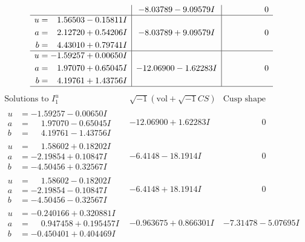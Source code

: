 \documentclass[1p]{elsarticle_modified}
\theoremstyle{definition}
\newcommand{\I}{\sqrt{-1}}
\begin{document}
$$\begin{array}{c|c|c}
 & -8.03789 - 9.09579 I & \phantom{-0.000000 } 0 \\ \hline\begin{aligned}
u &= \phantom{-}1.56503 - 0.15811 I \\
a &= \phantom{-}2.12720 + 0.54206 I \\
b &= \phantom{-}4.43010 + 0.79741 I\end{aligned}
 & -8.03789 + 9.09579 I & \phantom{-0.000000 } 0 \\ \hline\begin{aligned}
u &= -1.59257 + 0.00650 I \\
a &= \phantom{-}1.97070 + 0.65045 I \\
b &= \phantom{-}4.19761 + 1.43756 I\end{aligned}
 & -12.06900 - 1.62283 I & \phantom{-0.000000 } 0\\
 \hline 
 \end{array}$$\newpage$$\begin{array}{c|c|c}  
\text{Solutions to }I^u_{1}& \I (\text{vol} + \sqrt{-1}CS) & \text{Cusp shape}\\
 \hline 
\begin{aligned}
u &= -1.59257 - 0.00650 I \\
a &= \phantom{-}1.97070 - 0.65045 I \\
b &= \phantom{-}4.19761 - 1.43756 I\end{aligned}
 & -12.06900 + 1.62283 I & \phantom{-0.000000 } 0 \\ \hline\begin{aligned}
u &= \phantom{-}1.58602 + 0.18202 I \\
a &= -2.19854 + 0.10847 I \\
b &= -4.50456 + 0.32567 I\end{aligned}
 & -6.4148 - 18.1914 I & \phantom{-0.000000 } 0 \\ \hline\begin{aligned}
u &= \phantom{-}1.58602 - 0.18202 I \\
a &= -2.19854 - 0.10847 I \\
b &= -4.50456 - 0.32567 I\end{aligned}
 & -6.4148 + 18.1914 I & \phantom{-0.000000 } 0 \\ \hline\begin{aligned}
u &= -0.240166 + 0.320881 I \\
a &= \phantom{-}0.947458 + 0.195457 I \\
b &= -0.450401 + 0.404469 I\end{aligned}
 & -0.963675 + 0.866301 I & -7.31478 - 5.07695 I \\ \hline\begin{aligned}

\end{aligned}
\end{array}$$
\end{document}
